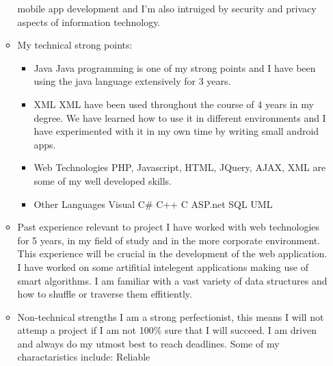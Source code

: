 \documentclass[12pt, oneside]{article}
\begin{document}
\begin{enumerate}
\begin{itemize}
				mobile app development and I'm also intruiged by security and privacy aspects of information technology.\newline
			\item My technical strong points:
				\begin{itemize}
				\item Java\newline
					Java programming is one of my strong points and I have been using the java language extensively for 3 years.
				\item XML\newline
					XML have been used throughout the course of 4 years in my degree. We have learned how to use it 
					in different environments and I have experimented with it in my own time by writing small android apps.
				\item Web Technologies\newline
					PHP, Javascript, HTML, JQuery, AJAX, XML are some of my well developed skills.
				\item Other Languages\newline
					Visual C\#\newline
					C++\newline
					C\newline
					ASP.net\newline
					SQL\newline
					UML\newline	
				\end{itemize}				
			\item Past experience relevant to project\newline\newline
				I have worked with web technologies for 5 years, in my field of study and in the more corporate 							environment. This experience will be crucial in the development of the web application. I have worked on some artifitial intelegent applications making use of smart algorithms. I am familiar with a vast variety of data structures and how to shuffle or traverse them effitiently.\newline
			\item Non-technical strengths\newline\newline
				I am  a strong perfectionist, this means I will not attemp a project if I am not 100\% sure that I will succeed. I am driven and always do my utmost best to reach deadlines.  Some of my charactaristics include:\newline 
Reliable\newline

\end{itemize}
\end{enumerate}
\end{document}
